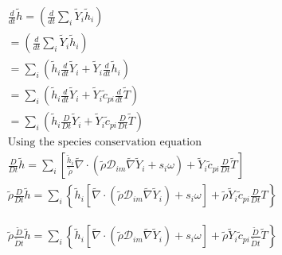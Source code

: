 \documentclass[preprint,12pt,authoryear]{elsarticle}
\begin{document}
\begin{equation}
\begin{split}
        \frac{d}{dt}\tilde{h}
        =
        \left(
                \frac{d}{dt}
		\sum\limits_i\tilde{Y}_i\tilde{h}_i
        \right)
\\
        =
        \left(
                \frac{d}{dt}
		\sum\limits_i\tilde{Y}_i
		\tilde{h}_i
        \right)
\\
        =
        \sum\limits_i
        \left(
                \tilde{h}_i
                \frac{d}{dt}
		\tilde{Y}_i
                +
                \tilde{Y}_i
                \frac{d}{dt}
		\tilde{h}_i
        \right)
\\
        =
        \sum\limits_i
        \left(
                \tilde{h}_i
                \frac{d}{dt}
		\tilde{Y}_i
                +
                \tilde{Y}_i
                \tilde{c}_{pi}
                \frac{d}{dt}
		\tilde{T}
        \right)
\\
        =
        \sum\limits_i
        \left(
                \tilde{h}_i
                \frac{D}{Dt}
		\tilde{Y}_i
                +
                \tilde{Y}_i
                \tilde{c}_{pi}
                \frac{D}{Dt}
		\tilde{T}
        \right)
\\
\text{Using the species conservation equation}
\\
        \frac{D}{Dt}
	\tilde{h}
        =
        \sum\limits_i
        \left[
                \frac{\tilde{h}_i}{\tilde{\rho}}
                \tilde{\nabla}\cdot
                (
		\tilde{\rho}\mathcal{D}_{im}\tilde{\nabla}\tilde{Y}_i
		+
        	s_i \omega
		)
                +
                \tilde{Y}_i
                \tilde{c}_{pi}
        	\frac{D}{Dt}
		\tilde{T}
        \right]
\\
        \tilde{\rho}
        \frac{D}{Dt}
	\tilde{h}
        =
        \sum\limits_i
        \left\{
                \tilde{h}_i
                [
                	\tilde{\nabla}\cdot
			   (
			\tilde{\rho}\mathcal{D}_{im}\tilde{\nabla}\tilde{Y}_i
			)
			+
        		s_i \omega
		    ]
                +
                \tilde{\rho}
                \tilde{Y}_i
                \tilde{c}_{pi}
        	\frac{D}{Dt}T
        \right\}
\end{split}
\end{equation}

\begin{equation}
\begin{split}
        \tilde{\rho}
        \frac{\tilde{D}}{\tilde{D} t}\tilde{h}
        =
        \sum\limits_i
        \left\{
                \tilde{h}_i
                [
                	\tilde{\nabla}\cdot
		     	(
			\tilde{\rho}\mathcal{D}_{im}\tilde{\nabla}\tilde{Y}_i
			)
			+
        		s_i \omega
	        	]
                +
                \tilde{\rho}
                \tilde{Y}_i
                \tilde{c}_{pi}
                \frac{\tilde{D}}{\tilde{D} t}
                \tilde{T}
        \right\}
\end{split}
\end{equation}
\end{document}
